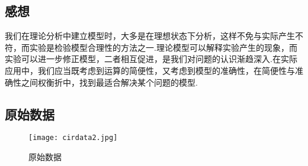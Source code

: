 \documentclass[12pt,a4paper,oneside,left=3.18,right=3.18,top=2.54,bottom=2.54]{ctexart}
\begin{document}
	\subsection{感想}
	我们在理论分析中建立模型时，大多是在理想状态下分析，这样不免与实际产生不符，而实验是检验模型合理性的方法之一.理论模型可以解释实验产生的现象，而实验可以进一步修正模型，二者相互促进，是我们对问题的认识渐趋深入.在实际应用中，我们应当既考虑到运算的简便性，又考虑到模型的准确性，在简便性与准确性之间权衡折中，找到最适合解决某个问题的模型.
	
\newpage
\begin{appendices}
	\renewcommand{\thesection}{附录 \Alph{section}}
	\section{原始数据}
		\begin{figure}[H]
		\centering
		\begin{turn}{0}
		\texttt{[image: cirdata2.jpg]}
		\end{turn}
		\caption{原始数据}
		\label{figure5}
		\end{figure}
\end{appendices}
\end{document}
